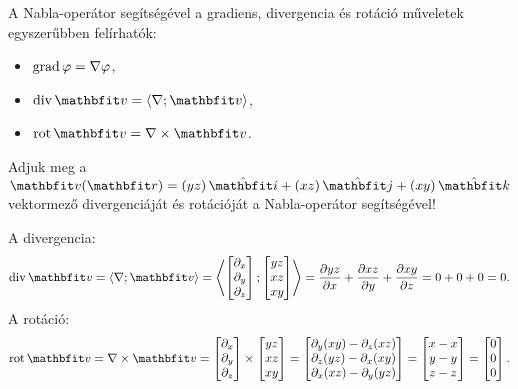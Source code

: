 \documentclass{szb-practice}
\begin{document}
\begin{note}[][nobreak]
  A Nabla-operátor segítségével a gradiens, divergencia és rotáció műveletek
  egyszerűbben felírhatók:
  \begin{itemize}
    \item $\operatorname{grad} \varphi = \nabla \varphi$,
    \item $\Div \rvec v = \scalar{\nabla}{\rvec v}$,
    \item $\rot \rvec v = \nabla \times \rvec v$.
  \end{itemize}
\end{note}

\begin{example}
  Adjuk meg a $\rvec v(\coordvec) = \ijk{yz}{xz}{xy}$ vektormező
  divergenciáját és rotációját a Nabla-operátor segítségével!

  A divergencia:
  $$
    \Div \rvec v
    = \scalar{\nabla}{\rvec v}
    = \scalar{\begin{bmatrix}
        \partial_x \\ \partial_y \\ \partial_z
      \end{bmatrix}}{\begin{bmatrix}
        yz \\ xz \\ xy
      \end{bmatrix}}
    = \pdv{yz}{x} + \pdv{xz}{y} + \pdv{xy}{z}
    = 0 + 0 + 0
    = 0
    \text.
  $$
  A rotáció:
  $$
    \rot \rvec v
    = \nabla \times \rvec v
    = \begin{bmatrix}
      \partial_x \\ \partial_y \\ \partial_z
    \end{bmatrix} \times \begin{bmatrix}
      yz \\ xz \\ xy
    \end{bmatrix}
    = \begin{bmatrix}
      \partial_y (xy) - \partial_z (xz) \\
      \partial_z (yz) - \partial_x (xy) \\
      \partial_x (xz) - \partial_y (yz)
    \end{bmatrix} = \begin{bmatrix}
      x - x \\ y - y \\ z - z
    \end{bmatrix} = \begin{bmatrix}
      0 \\ 0 \\ 0
    \end{bmatrix}
    \text.
  $$
\end{example}
\end{document}
